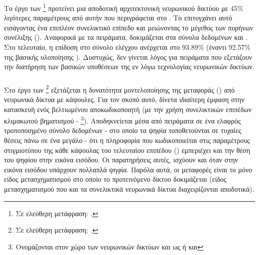 \subsubsection{}

Το έργο των  \footnote{Σε ελεύθερη μετάφραση: .} \cite{luo2019r} προτείνει μια αποδοτική αρχιτεκτονική νευρωνικού δικτύου με 45\% λιγότερες παραμέτρους από αυτήν που περιγράφεται στο \cite{sabour2017dynamic}. Το επιτυγχάνει αυτό εισάγοντας ένα επιπλέον συνελικτικό επίπεδο και μειώνοντας το μέγεθος των πυρήνων συνέλιξης (). Αναφορικά με τα πειράματα, δοκιμάζεται στα σύνολα δεδομένων  και . Στο τελευταίο, η επίδοση στο σύνολο ελέγχου ανέρχεται στο 93.89\% (έναντι 92.57\% της βασικής υλοποίησης \cite{sabour2017dynamic}). Δυστυχώς, δεν γίνεται λόγος για πειράματα που εξετάζουν την διατήρηση των βασικών υποθέσεων της εν λόγω τεχνολογίας νευρωνικών δικτύων.

\subsubsection{}

Στο έργο των  \footnote{Σε ελεύθερη μετάφραση: .} \cite{luo2020capsnet} εξετάζεται η δυνατότητα μοντελοποίησης της μεταφοράς () από νευρωνικά δίκτυα με κάψουλες. Για τον σκοπό αυτό, δίνετα ιδιαίτερη έμφαση στην κατασκευή ενός βελτιωμένου αποκωδικοποιητή (με την χρήση συνελικτικών επιπέδων κλιμακωτού βηματισμού - \footnote{Ονομάζονται στον χώρο των νευρωνικών δικτύων και ως  ή και }). Αποδηκνείεται μέσα από πειράματα σε ένα ελαφρός τροποποιημένο σύνολο δεδομένων  - στο οποίο τα ψηφία τοποθετούνται σε τυχαίες θέσεις πάνω σε ένα μεγάλο  - ότι η πληροφορία που κωδικοποιείται στις παραμέτρους στιγμιοτύπου της κάθε κάψουλας του τελευταίου επιπέδου () εμπεριέχει και την θέση του ψηφίου στην εικόνα εισόδου. Οι παρατηρήσεις αυτές, ισχύουν και όταν στην εικόνα εισόδου υπάρχουν πολλαπλά ψηφία. Παρόλα αυτά, οι μεταφορές είναι το μόνο είδος μετασχηματισμού στο οποίο το προτεινόμενο δίκτυο δοκιμάζεται (είδος μετασχηματισμού που και τα συνελικτικά νευρωνικά δίκτυα διαχειρίζονται αποδοτικά).

